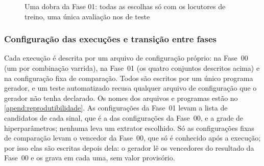 				

				\begin{figure}[h]
					\centering
					\caption[Fluxograma da Fase 01]{Uma dobra da Fase 01: todas as escolhas só com os locutores de treino, uma única avaliação nos de teste}
					\scalebox{0.82}{}
					\label{fig:e05Phase01Flow}
				\end{figure}

			\subsubsection{Configuração das execuções e transição entre fases}

				\par Cada execução é descrita por um arquivo de configuração próprio:  na Fase~00 (um por combinação varrida),  na Fase~01 (os quatro conjuntos descritos acima) e  na configuração fixa de comparação. Todos são escritos por um único programa gerador, e um teste automatizado recusa qualquer arquivo de configuração que o gerador não tenha declarado. Os nomes dos arquivos e programas estão no \autoref{apend:reprodutibilidade}. As configurações da Fase~01 levam a lista de candidatos de cada sinal, que é a das configurações da Fase~00, e a grade de hiperparâmetros; nenhuma leva um extrator escolhido. Só as configurações fixas de comparação levam o vencedor da Fase~00, que só é conhecido após a execução; por isso elas são escritas depois dela: o gerador lê os vencedores do resultado da Fase~00 e os grava em cada uma, sem valor provisório.

